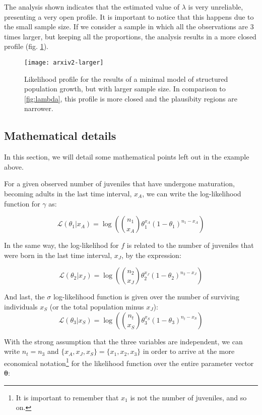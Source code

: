 \documentclass[twoside,12pt,a4paper]{article}
\begin{document}
The analysis shown indicates that the estimated value of $\lambda$ is very unreliable, presenting a
very open profile. It is important to notice that this happens due to the small sample size. If we consider
a sample in which all the observations are 3 times larger, but keeping all the proportions,
the analysis results in a more closed profile (fig. \ref{fig:lambda2}).

\begin{figure}
\texttt{[image: arxiv2-larger]}
	\caption{Likelihood profile for the results of a minimal model of structured population growth, but with
  larger sample size. In comparison to \ref{fig:lambda}, this profile is more closed and the plausibity
  regions are narrower. }
	\label{fig:lambda2}
\end{figure}

\newpage
\subsection{Mathematical details}\label{apmat}
In this section, we will detail some mathematical points left out in the example above.

For a given observed number of juveniles that have undergone maturation, becoming adults in the last time
interval, $x_A$, we can write the log-likelihood function for $\gamma$ as:

\begin{equation}
\mathcal{L} \left( \theta_1 | x_A \right) 
= \log \left( {n_1 \choose x_A} \theta_1^{x_A} (1-\theta_1) ^{n_1-x_A} \right)
\end{equation}

In the same way, the log-likelihod for $f$ is related to the number of juveniles that were born in the
last time interval, $x_J$, by the expression:

\begin{equation}
\mathcal{L} \left( \theta_2 | x_J \right) 
= \log \left( {n_2 \choose x_J} \theta_2^{x_J} (1-\theta_2) ^{n_2-x_J} \right)
\end{equation}

And last, the $\sigma$ log-likelihood function is given over the number of surviving individuals $x_S$
(or the total population minus $x_J$):
\begin{equation}
\mathcal{L} \left( \theta_3 | x_S \right) 
= \log \left( {n_t \choose x_S} \theta_3^{x_S} (1-\theta_3) ^{n_t-x_S} \right)
\end{equation}

With the strong assumption that the three variables are independent, we can write $n_t = n_3$ and
$\{x_A, x_J, x_S\} = \{x_1, x_2, x_3\}$ in order to arrive at the more economical notation\footnote{
It is important to remember that $x_1$ is not the number of juveniles, and so on.}
for the likelihood function over the entire parameter vector $\boldsymbol\theta$:
\end{document}
